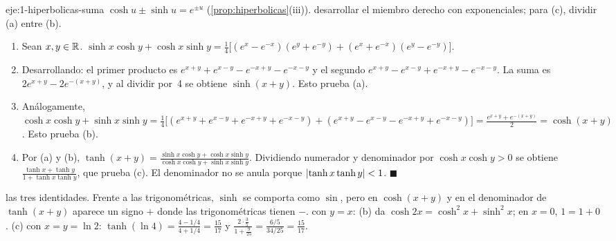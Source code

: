 \begin{solucion}{eje:1-hiperbolicas-suma}
\datos $\cosh u\pm\sinh u=e^{\pm u}$ (\cref{prop:hiperbolicas}(iii)).
\planteamiento desarrollar el miembro derecho con exponenciales; para (c), dividir (a) entre (b).
\pasos
\begin{enumerate}[label=\arabic*.]
  \item Sean $x,y\in\mathbb{R}$. $\sinh x\cosh y+\cosh x\sinh y=\frac14\bigl[(e^{x}-e^{-x})(e^{y}+e^{-y})+(e^{x}+e^{-x})(e^{y}-e^{-y})\bigr]$.
  \item Desarrollando: el primer producto es $e^{x+y}+e^{x-y}-e^{-x+y}-e^{-x-y}$ y el segundo $e^{x+y}-e^{x-y}+e^{-x+y}-e^{-x-y}$. La suma es $2e^{x+y}-2e^{-(x+y)}$, y al dividir por~4 se obtiene $\sinh(x+y)$. Esto prueba (a).
  \item Análogamente, $\cosh x\cosh y+\sinh x\sinh y=\frac14\bigl[(e^{x+y}+e^{x-y}+e^{-x+y}+e^{-x-y})+(e^{x+y}-e^{x-y}-e^{-x+y}+e^{-x-y})\bigr]=\frac{e^{x+y}+e^{-(x+y)}}{2}=\cosh(x+y)$. Esto prueba (b).
  \item Por (a) y (b), $\tanh(x+y)=\frac{\sinh x\cosh y+\cosh x\sinh y}{\cosh x\cosh y+\sinh x\sinh y}$. Dividiendo numerador y denominador por $\cosh x\cosh y>0$ se obtiene $\frac{\tanh x+\tanh y}{1+\tanh x\tanh y}$, que prueba (c). El denominador no se anula porque $\lvert\tanh x\tanh y\rvert<1$. \hfill$\blacksquare$
\end{enumerate}
\resultado las tres identidades. Frente a las trigonométricas, $\sinh$ se comporta como $\sin$, pero en $\cosh(x+y)$ y en el denominador de $\tanh(x+y)$ aparece un signo $+$ donde las trigonométricas tienen $-$.
\comprobacion con $y=x$: (b) da $\cosh2x=\cosh^{2}x+\sinh^{2}x$; en $x=0$, $1=1+0$. (c) con $x=y=\ln2$: $\tanh(\ln4)=\frac{4-1/4}{4+1/4}=\frac{15}{17}$ y $\frac{2\cdot\frac35}{1+\frac{9}{25}}=\frac{6/5}{34/25}=\frac{15}{17}$.
\end{solucion}

